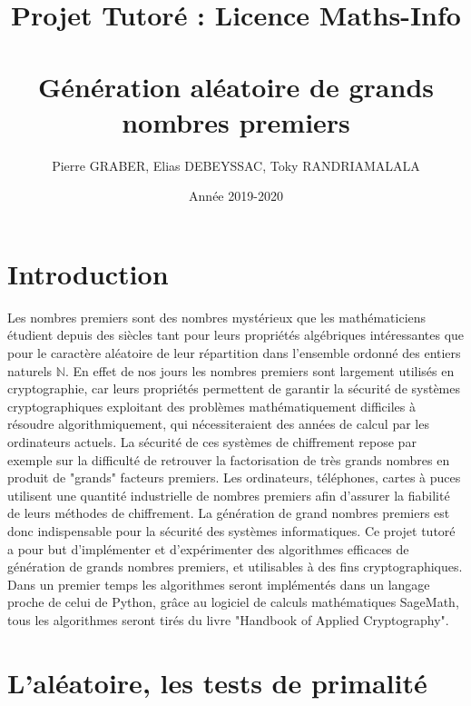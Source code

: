 \documentclass{article}
\title{Projet Tutoré : Licence Maths-Info
\section*{Génération aléatoire de grands nombres premiers }
\date{ Année 2019-2020}
}
\author{Pierre GRABER, Elias DEBEYSSAC, Toky RANDRIAMALALA}
\begin{document}
\maketitle

\section*{Introduction}
Les nombres premiers sont des nombres mystérieux que les mathématiciens étudient depuis des siècles tant pour leurs propriétés algébriques intéressantes que pour le caractère  aléatoire de leur répartition dans l'ensemble ordonné des entiers naturels $\mathbb{N}$. En effet de nos jours les nombres premiers sont largement utilisés  en cryptographie, car  leurs propriétés permettent de garantir la sécurité de systèmes cryptographiques exploitant des problèmes mathématiquement difficiles à résoudre algorithmiquement, qui nécessiteraient des années de calcul par les ordinateurs actuels. \newline 
La sécurité de ces systèmes de chiffrement repose par exemple sur la difficulté de retrouver la factorisation de très grands nombres en produit de "grands" facteurs premiers. Les ordinateurs, téléphones, cartes à puces utilisent une quantité industrielle de nombres premiers afin d'assurer la fiabilité de leurs méthodes de chiffrement. La génération de grand nombres premiers est donc indispensable pour la sécurité des systèmes informatiques. Ce projet tutoré a pour but d'implémenter et d'expérimenter des algorithmes efficaces de génération de grands nombres premiers, et utilisables à des fins cryptographiques. Dans un premier temps les algorithmes seront implémentés dans un langage proche de celui de Python, grâce au logiciel de calculs mathématiques SageMath, tous les algorithmes seront tirés du livre "Handbook of Applied Cryptography".






\newpage
\tableofcontents


\newpage

\section{L'aléatoire, les tests de primalité}
\end{document}
